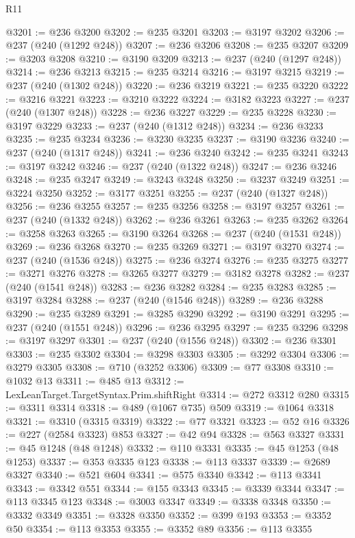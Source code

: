 \begin{lexlean}{R11}
\begin{coremodule}
@3201 := @236 @3200
@3202 := @235 @3201
@3203 := @3197 @3202
@3206 := @237 (@240 (@1292 @248))
@3207 := @236 @3206
@3208 := @235 @3207
@3209 := @3203 @3208
@3210 := @3190 @3209
@3213 := @237 (@240 (@1297 @248))
@3214 := @236 @3213
@3215 := @235 @3214
@3216 := @3197 @3215
@3219 := @237 (@240 (@1302 @248))
@3220 := @236 @3219
@3221 := @235 @3220
@3222 := @3216 @3221
@3223 := @3210 @3222
@3224 := @3182 @3223
@3227 := @237 (@240 (@1307 @248))
@3228 := @236 @3227
@3229 := @235 @3228
@3230 := @3197 @3229
@3233 := @237 (@240 (@1312 @248))
@3234 := @236 @3233
@3235 := @235 @3234
@3236 := @3230 @3235
@3237 := @3190 @3236
@3240 := @237 (@240 (@1317 @248))
@3241 := @236 @3240
@3242 := @235 @3241
@3243 := @3197 @3242
@3246 := @237 (@240 (@1322 @248))
@3247 := @236 @3246
@3248 := @235 @3247
@3249 := @3243 @3248
@3250 := @3237 @3249
@3251 := @3224 @3250
@3252 := @3177 @3251
@3255 := @237 (@240 (@1327 @248))
@3256 := @236 @3255
@3257 := @235 @3256
@3258 := @3197 @3257
@3261 := @237 (@240 (@1332 @248))
@3262 := @236 @3261
@3263 := @235 @3262
@3264 := @3258 @3263
@3265 := @3190 @3264
@3268 := @237 (@240 (@1531 @248))
@3269 := @236 @3268
@3270 := @235 @3269
@3271 := @3197 @3270
@3274 := @237 (@240 (@1536 @248))
@3275 := @236 @3274
@3276 := @235 @3275
@3277 := @3271 @3276
@3278 := @3265 @3277
@3279 := @3182 @3278
@3282 := @237 (@240 (@1541 @248))
@3283 := @236 @3282
@3284 := @235 @3283
@3285 := @3197 @3284
@3288 := @237 (@240 (@1546 @248))
@3289 := @236 @3288
@3290 := @235 @3289
@3291 := @3285 @3290
@3292 := @3190 @3291
@3295 := @237 (@240 (@1551 @248))
@3296 := @236 @3295
@3297 := @235 @3296
@3298 := @3197 @3297
@3301 := @237 (@240 (@1556 @248))
@3302 := @236 @3301
@3303 := @235 @3302
@3304 := @3298 @3303
@3305 := @3292 @3304
@3306 := @3279 @3305
@3308 := @710 (@3252 @3306)
@3309 := @77 @3308
@3310 := @1032 @13
@3311 := @485 @13
@3312 := LexLeanTarget.TargetSyntax.Prim.shiftRight
@3314 := @272 @3312 @280
@3315 := @3311 @3314
@3318 := @489 (@1067 @735) @509
@3319 := @1064 @3318
@3321 := @3310 (@3315 @3319)
@3322 := @77 @3321
@3323 := @52 @16
@3326 := @227 (@2584 @3323) @853
@3327 := @42 @94
@3328 := @563 @3327
@3331 := @45 @1248 (@48 @1248)
@3332 := @110 @3331
@3335 := @45 @1253 (@48 @1253)
@3337 := @353 @3335 @123
@3338 := @113 @3337
@3339 := @2689 @3327
@3340 := @521 @604
@3341 := @575 @3340
@3342 := @113 @3341
@3343 := @3342 @551
@3344 := @155 @3343
@3345 := @3339 @3344
@3347 := @113 @3345 @123
@3348 := @3003 @3347
@3349 := @3338 @3348
@3350 := @3332 @3349
@3351 := @3328 @3350
@3352 := @399 @193
@3353 := @3352 @50
@3354 := @113 @3353
@3355 := @3352 @89
@3356 := @113 @3355

\end{coremodule}
\end{lexlean}
